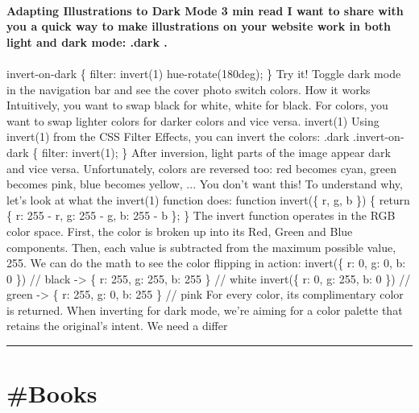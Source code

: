 \documentclass[10pt,a4paper]{article}
\begin{document}
\begin{multicols}{2}
\paragraph{}
\textbf{Adapting Illustrations to Dark Mode
3 min read
I want to share with you a quick way to make illustrations on your website work in both light and dark mode:
.dark .}
\paragraph{}
invert-on-dark \{ filter: invert(1) hue-rotate(180deg); \}
Try it!
Toggle dark mode in the navigation bar and see the cover photo switch colors.
How it works
Intuitively, you want to swap black for white, white for black. For colors, you want to swap lighter colors for darker colors and vice versa.
invert(1)
Using
invert(1) from the CSS Filter Effects, you can invert the colors:
.dark .invert-on-dark \{ filter: invert(1); \}
After inversion, light parts of the image appear dark and vice versa.
Unfortunately, colors are reversed too: red becomes cyan, green becomes pink, blue becomes yellow, ... You don't want this!
To understand why, let's look at what the
invert(1) function does:
function invert(\{ r, g, b \}) \{ return \{ r: 255 - r, g: 255 - g, b: 255 - b \}; \}
The invert function operates in the RGB color space. First, the color is broken up into its Red, Green and Blue components. Then, each value is subtracted from the maximum possible value, 255.
We can do the math to see the color flipping in action:
invert(\{ r: 0, g: 0, b: 0 \}) // black -> \{ r: 255, g: 255, b: 255 \} // white invert(\{ r: 0, g: 255, b: 0 \}) // green -> \{ r: 255, g: 0, b: 255 \} // pink
For every color, its complimentary color is returned. When inverting for dark mode, we're aiming for a color palette that retains the original's intent. We need a differ
\par\noindent\textcolor{red}{\rule{\linewidth}{0.2mm}}
\vfill
\null
\end{multicols}

\newpage
\section{\#Books}
\end{document}
